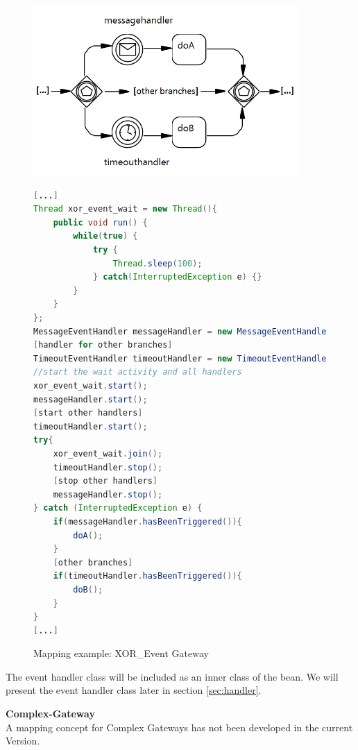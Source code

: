 \begin{figure}[h]
\begin{minipage}[c]{0.5\textwidth}
\includegraphics[width=0.9\textwidth]{images/mapping/xor-event.png}
\end{minipage}
\begin{minipage}[c]{0.5\textwidth}
\begin{lstlisting}[language=Java]
[...]
Thread xor_event_wait = new Thread(){
	public void run() {
		while(true) {
			try {
				Thread.sleep(100);
			} catch(InterruptedException e) {}
		}
	}
};
MessageEventHandler messageHandler = new MessageEventHandler(xor_event_wait);
[handler for other branches]
TimeoutEventHandler timeoutHandler = new TimeoutEventHandler(20000, xor_event_wait);
//start the wait activity and all handlers
xor_event_wait.start();
messageHandler.start();
[start other handlers]
timeoutHandler.start();
try{
	xor_event_wait.join();
	timeoutHandler.stop();
	[stop other handlers]
	messageHandler.stop();
} catch (InterruptedException e) {
	if(messageHandler.hasBeenTriggered()){
		doA();
	}
	[other branches]
	if(timeoutHandler.hasBeenTriggered()){
		doB();
	}
}
[...]
\end{lstlisting}
\end{minipage}
\caption{Mapping example: XOR\_Event Gateway}%
\label{fig:mapping_xorEvent}%
\end{figure}

The event handler class will be included as an inner class of the bean. We will present the event handler class later in section \ref{sec:handler}.

\textbf{Complex-Gateway}\\
A mapping concept for Complex Gateways has not been developed in the current Version. \\

